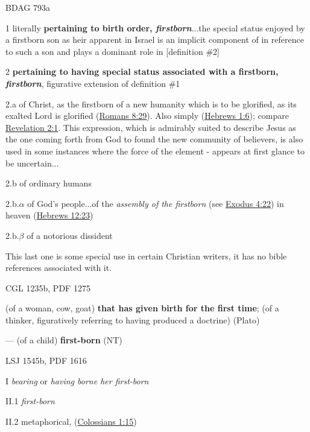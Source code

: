 				\begin{compactdesc}
					\item[BDAG 793a] \textbf{}
						\begin{compactitem}
							\item[1] literally \textbf{pertaining to birth order, \textit{firstborn}}...the special status enjoyed by a firstborn son as heir apparent in Israel is an implicit component of  in reference to such a son and plays a dominant role in [definition \#2]
							\item[2] \textbf{pertaining to having special status associated with a firstborn, \textit{firstborn}}, figurative extension of definition \#1
							\item[2.a] of Christ, as the firstborn of a new humanity which is to be glorified, as its exalted Lord is glorified  (\hyperref[ROMANS-8-29]{Romans 8:29}). Also simply  (\hyperref[HEBREWS-1-6]{Hebrews 1:6}); compare \hyperref[REVELATIONNT-2-1]{Revelation 2:1}. This expression, which is admirably suited to describe Jesus as the one coming forth from God to found the new community of believers, is also used in some instances where the force of the element - appears at first glance to be uncertain...
							\item[2.b] of ordinary humans
							\item[2.b.$\alpha$] of God's people...of the \textit{assembly of the firstborn} (see \hyperref[EXODUS-4-22]{Exodus 4:22}) in heaven  (\hyperref[HEBREWS-12-23]{Hebrews 12:23})
							\item[2.b.$\beta$] of a notorious dissident 
								\begin{compactitem}
									\item This last one is some special use in certain Christian writers, it has no bible references associated with it.
								\end{compactitem}
						\end{compactitem}
					\item[CGL 1235b, PDF 1275] \textbf{}
						\begin{compactitem}
							\item (of a woman, cow, goat) \textbf{that has given birth for the first time}; (of a thinker, figuratively referring to having produced a doctrine) (Plato)
							\item --- (of a child) \textbf{first-born} (NT)
						\end{compactitem}
					\item[LSJ 1545b, PDF 1616] \textbf{}
						\begin{compactitem}
							\item[I] \textit{bearing} or \textit{having borne her first-born}
							\item[II.1] \textit{first-born}
							\item[II.2] metaphorical,  (\hyperref[COLOSSIANS-1-15]{Colossians 1:15})
						\end{compactitem}
				\end{compactdesc}
				
